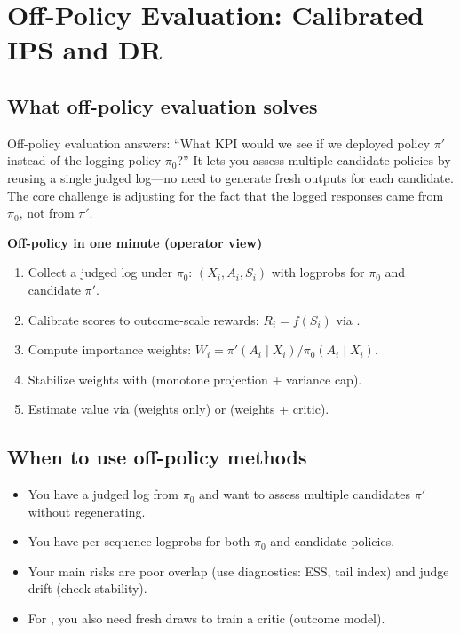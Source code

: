 \section{Off-Policy Evaluation: Calibrated IPS and DR}

\subsection{What off-policy evaluation solves}

Off-policy evaluation answers: ``What KPI would we see if we deployed policy $\pi'$ instead of the logging policy $\pi_0$?'' It lets you assess multiple candidate policies by reusing a single judged log---no need to generate fresh outputs for each candidate. The core challenge is adjusting for the fact that the logged responses came from $\pi_0$, not from $\pi'$.

\begin{quickref}
\textbf{Off-policy in one minute (operator view)}
\begin{enumerate}
\item Collect a judged log under $\pi_0$: $(X_i, A_i, S_i)$ with logprobs for $\pi_0$ and candidate $\pi'$.
\item Calibrate scores to outcome-scale rewards: $R_i = f(S_i)$ via \autocal.
\item Compute importance weights: $W_i = \pi'(A_i \mid X_i) / \pi_0(A_i \mid X_i)$.
\item Stabilize weights with \simcal{} (monotone projection + variance cap).
\item Estimate value via \ips{} (weights only) or \dr{} (weights + critic).
\end{enumerate}
\end{quickref}

\subsection{When to use off-policy methods}

\begin{itemize}
\item You have a judged log from $\pi_0$ and want to assess multiple candidates $\pi'$ without regenerating.
\item You have per-sequence logprobs for both $\pi_0$ and candidate policies.
\item Your main risks are poor overlap (use diagnostics: ESS, tail index) and judge drift (check stability).
\item For \dr, you also need fresh draws to train a critic (outcome model).
\end{itemize}

